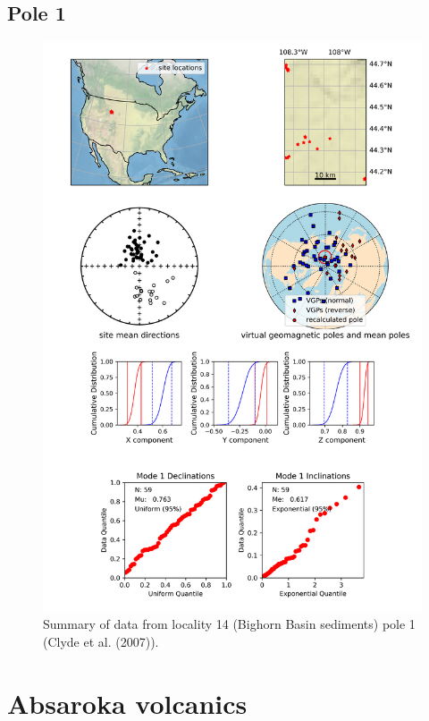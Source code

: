 \subsection{Pole 1}


\begin{figure}[H]
\centering
\includegraphics[width=5 in]{./14/1/pole_summary.png}
\caption{Summary of data from locality 14 (Bighorn Basin sediments) pole 1 (Clyde et al. (2007)).}
\end{figure}

\section{Absaroka volcanics}
